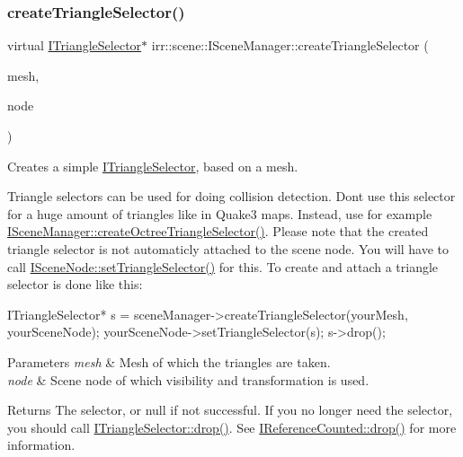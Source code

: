 \subsubsection{\texorpdfstring{create\+Triangle\+Selector()}{createTriangleSelector()}\hspace{0.1cm}{\footnotesize\ttfamily [1/2]}}
{\footnotesize\ttfamily virtual \hyperlink{classirr_1_1scene_1_1ITriangleSelector}{I\+Triangle\+Selector}$\ast$ irr\+::scene\+::\+I\+Scene\+Manager\+::create\+Triangle\+Selector (\begin{DoxyParamCaption}\item[{\hyperlink{classirr_1_1scene_1_1IMesh}{I\+Mesh} $\ast$}]{mesh,  }\item[{\hyperlink{classirr_1_1scene_1_1ISceneNode}{I\+Scene\+Node} $\ast$}]{node }\end{DoxyParamCaption})\hspace{0.3cm}{\ttfamily [pure virtual]}}



Creates a simple \hyperlink{classirr_1_1scene_1_1ITriangleSelector}{I\+Triangle\+Selector}, based on a mesh. 

Triangle selectors can be used for doing collision detection. Don\textquotesingle{}t use this selector for a huge amount of triangles like in Quake3 maps. Instead, use for example \hyperlink{classirr_1_1scene_1_1ISceneManager_a4ed7d3b34f4d0c70395b6d464fe32b96}{I\+Scene\+Manager\+::create\+Octree\+Triangle\+Selector()}. Please note that the created triangle selector is not automaticly attached to the scene node. You will have to call \hyperlink{classirr_1_1scene_1_1ISceneNode_a87fb52ec54bf3ae117340d8defd1255f}{I\+Scene\+Node\+::set\+Triangle\+Selector()} for this. To create and attach a triangle selector is done like this\+: 
\begin{DoxyCode}
ITriangleSelector* s = sceneManager->createTriangleSelector(yourMesh,
        yourSceneNode);
yourSceneNode->setTriangleSelector(s);
s->drop();
\end{DoxyCode}
 
\begin{DoxyParams}{Parameters}
{\em mesh} & Mesh of which the triangles are taken. \\
\hline
{\em node} & Scene node of which visibility and transformation is used. \\
\hline
\end{DoxyParams}
\begin{DoxyReturn}{Returns}
The selector, or null if not successful. If you no longer need the selector, you should call \hyperlink{classirr_1_1IReferenceCounted_a03856a09355b89d178090c4a5f738543}{I\+Triangle\+Selector\+::drop()}. See \hyperlink{classirr_1_1IReferenceCounted_a03856a09355b89d178090c4a5f738543}{I\+Reference\+Counted\+::drop()} for more information. 
\end{DoxyReturn}
\mbox{\label{classirr_1_1scene_1_1ISceneManager_abc1ecc9a60abb40e7ffddbd72c077231}} 

